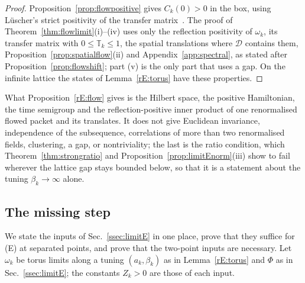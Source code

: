 \begin{proof}
Proposition~\ref{prop:flowpositive} gives $C_k(0)>0$ in the box, using
L\"uscher's strict positivity of the transfer matrix~\cite{Lus77}. The proof
of Theorem~\ref{thm:flowlimit}(i)--(iv) uses only the reflection positivity
of $\omega_k$, its transfer matrix with $0\le\mathbb T_k\le1$, the spatial
translations where $\mathcal D$ contains them, Proposition~\ref{prop:spatialflow}(ii)
and Appendix~\ref{app:spectral}, as stated after
Proposition~\ref{prop:flowshift}; part (v) is the only part that uses a
gap. On the infinite lattice the states of Lemma~\ref{rE:torus} have these
properties.
\end{proof}

What Proposition~\ref{rE:flow} gives is the Hilbert space, the positive
Hamiltonian, the time semigroup and the reflection-positive inner product
of one renormalised flowed packet and its translates. It does not give
Euclidean invariance, independence of the subsequence, correlations of more
than two renormalised fields, clustering, a gap, or nontriviality; the last
is the ratio condition, which Theorem~\ref{thm:strongratio} and
Proposition~\ref{prop:limitEnorm}(iii) show to fail wherever the lattice
gap stays bounded below, so that it is a statement about the tuning
$\beta_k\to\infty$ alone.

\subsection{The missing step}\label{ssec:rEmissing}

We state the inputs of Sec.~\ref{ssec:limitE} in one place, prove that
they suffice for (E) at separated points, and prove that the two-point
inputs are necessary. Let $\omega_k$ be torus limits along a tuning
$(a_k,\beta_k)$ as in Lemma~\ref{rE:torus} and $\Phi$ as in
Sec.~\ref{ssec:limitE}; the constants $Z_k>0$ are those of each input.

